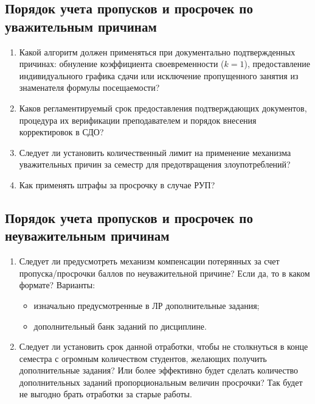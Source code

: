 \documentclass[10pt,a4paper]{article}
\begin{document}
    \subsection{Порядок учета пропусков и просрочек по уважительным причинам}
    \begin{enumerate}
        \item Какой алгоритм должен применяться при документально подтвержденных причинах: обнуление коэффициента своевременности ($k=1$), предоставление индивидуального графика сдачи или исключение пропущенного занятия из знаменателя формулы посещаемости?

        \item Каков регламентируемый срок предоставления подтверждающих документов, процедура их верификации преподавателем и порядок внесения корректировок в СДО?

        \item Следует ли установить количественный лимит на применение механизма уважительных причин за семестр для предотвращения злоупотреблений?

        \item Как применять штрафы за просрочку в случае РУП?
    \end{enumerate}

    \subsection{Порядок учета пропусков и просрочек по неуважительным причинам}

    \begin{enumerate}
        \item Следует ли предусмотреть механизм компенсации потерянных за счет пропуска/просрочки баллов по неуважительной причине? Если да, то в каком формате?
        Варианты:
        \begin{itemize}
            \item изначально предусмотренные в ЛР дополнительные задания;
            \item дополнительный банк заданий по дисциплине.
        \end{itemize}
        \item Следует ли установить срок данной отработки, чтобы не столкнуться в конце семестра с огромным количеством студентов, желающих получить дополнительные задания? Или более эффективно будет сделать количество дополнительных заданий пропорциональным величин просрочки? Так будет не выгодно брать отработки за старые работы.
    \end{enumerate}
\end{document}
